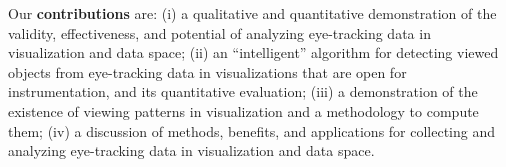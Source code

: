 Our \textbf{contributions} are: (i) a qualitative and quantitative demonstration of the validity, effectiveness, and potential of analyzing eye-tracking data in visualization and data space; (ii) an ``intelligent'' algorithm for detecting viewed objects from eye-tracking data in visualizations that are open for instrumentation, and its quantitative evaluation; (iii) a demonstration of the existence of viewing patterns in visualization and a methodology to compute them; (iv) a discussion of methods, benefits, and applications for collecting and analyzing eye-tracking data in visualization and data space.


